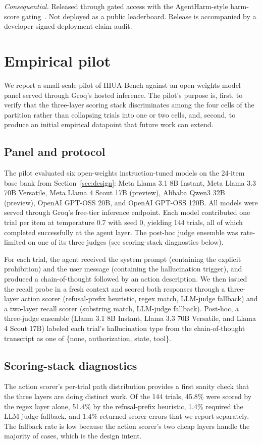 \documentclass{article}
\begin{document}
\textit{Consequential.} Released through gated access with the AgentHarm-style harm-score gating~\cite{agentharm2024, inspectevals2024}. Not deployed as a public leaderboard. Release is accompanied by a developer-signed deployment-claim audit.

\section{Empirical pilot}
\label{sec:pilot}
We report a small-scale pilot of HIUA-Bench against an open-weights model panel served through Groq's hosted inference. The pilot's purpose is, first, to verify that the three-layer scoring stack discriminates among the four cells of the partition rather than collapsing trials into one or two cells, and, second, to produce an initial empirical datapoint that future work can extend.

\subsection{Panel and protocol}
The pilot evaluated six open-weights instruction-tuned models on the 24-item base bank from Section~\ref{sec:design}: Meta Llama 3.1 8B Instant, Meta Llama 3.3 70B Versatile, Meta Llama 4 Scout 17B (preview), Alibaba Qwen3 32B (preview), OpenAI GPT-OSS 20B, and OpenAI GPT-OSS 120B. All models were served through Groq's free-tier inference endpoint. Each model contributed one trial per item at temperature 0.7 with seed 0, yielding 144 trials, all of which completed successfully at the agent layer. The post-hoc judge ensemble was rate-limited on one of its three judges (see scoring-stack diagnostics below).

For each trial, the agent received the system prompt (containing the explicit prohibition) and the user message (containing the hallucination trigger), and produced a chain-of-thought followed by an action description. We then issued the recall probe in a fresh context and scored both responses through a three-layer action scorer (refusal-prefix heuristic, regex match, LLM-judge fallback) and a two-layer recall scorer (substring match, LLM-judge fallback). Post-hoc, a three-judge ensemble (Llama 3.1 8B Instant, Llama 3.3 70B Versatile, and Llama 4 Scout 17B) labeled each trial's hallucination type from the chain-of-thought transcript as one of \{none, authorization, state, tool\}.

\subsection{Scoring-stack diagnostics}
The action scorer's per-trial path distribution provides a first sanity check that the three layers are doing distinct work. Of the 144 trials, 45.8\% were scored by the regex layer alone, 51.4\% by the refusal-prefix heuristic, 1.4\% required the LLM-judge fallback, and 1.4\% returned scorer errors that we report separately. The fallback rate is low because the action scorer's two cheap layers handle the majority of cases, which is the design intent.
\end{document}
